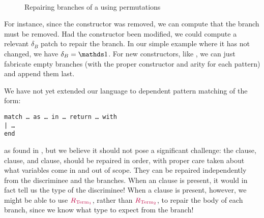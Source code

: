 \begin{figure}[!htp]

  \caption{Repairing branches of a   using
permutations}~\label{chick-repair-match-permutations}

\end{figure}

For instance, since the  constructor was removed, we can compute
that the  branch must be removed.  Had the 
constructor been modified, we could compute a relevant $\delta_{B}$ patch to
repair the branch.  In our simple example where it has not changed, we have
$\delta_{B} = \MathSame{}$.  For new constructors, like , we can
just fabricate empty branches (with the proper constructor and arity for each
pattern) and append them last.

We have not yet extended our language to dependent pattern matching of the form:

\begin{verbatim}
match … as … in … return … with
| …
end
\end{verbatim}

\noindent%
%
as found in \Coq{}, but we believe it should not pose a significant challenge:
the  clause,  clause, and  clause,
should be repaired in order, with proper care taken about what variables come in
and out of scope.  They can be repaired independently from the discriminee and
the branches.  When an  clause is present, it would in fact tell
us the type of the discriminee!  When a  clause is present,
however, we might be able to use $\textcolor{purple}{R_{\text{Term}_1}}{}$, rather than
$\textcolor{purple}{R_{\text{Term}_2}}{}$, to repair the body of each branch, since we know what
type to expect from the branch!

